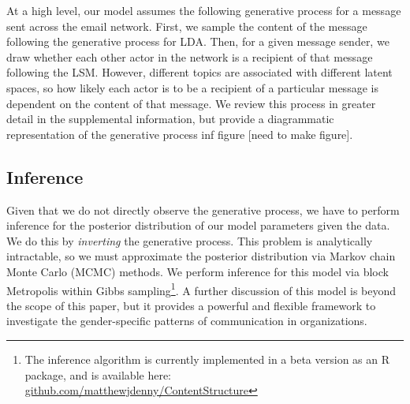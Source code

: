 \documentclass{pnastwo}
\begin{document}
\begin{article}
At a high level, our model assumes the following generative process for a message sent across the email network. First, we sample the content of the message following the generative process for LDA. Then, for a given message sender, we draw whether each other actor in the network is a recipient of that message following the LSM. However, different topics are associated with different latent spaces, so how likely each actor is to be a recipient of a particular message is dependent on the content of that message. We review this process in greater detail in the supplemental information, but provide a diagrammatic representation of the generative process inf figure [need to make figure].


\subsection{Inference}
Given that we do not directly observe the generative process, we have to perform inference for the posterior distribution of our model parameters given the data. We do this by \emph{inverting} the generative process. This problem is analytically intractable, so we must approximate the posterior distribution via Markov chain Monte Carlo (MCMC) methods. We perform inference for this model via block Metropolis within Gibbs sampling\footnote{The inference algorithm is currently implemented in a beta version as an R package, and is available here: \href{https://github.com/matthewjdenny/ContentStructure}{github.com/matthewjdenny/ContentStructure}}. A further discussion of this model is beyond the scope of this paper, but it provides a powerful and flexible framework to investigate the gender-specific patterns of communication in organizations.



\end{article}
\end{document}
